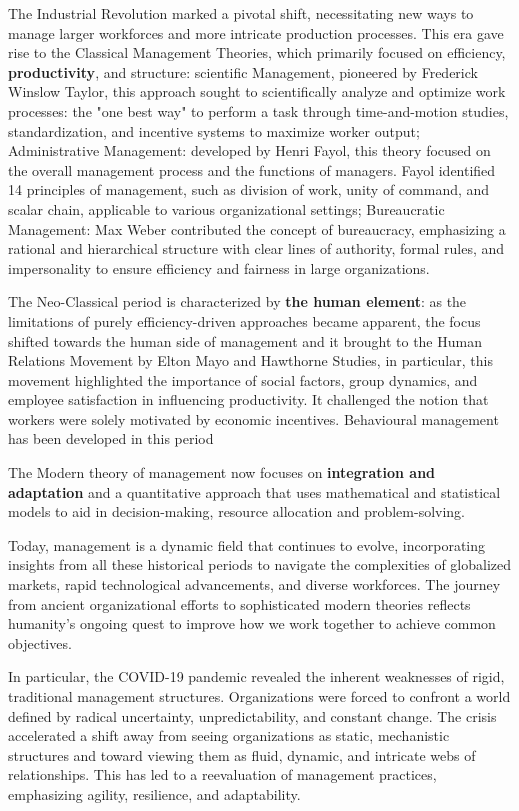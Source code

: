 \documentclass{article}
\begin{document}
The Industrial Revolution marked a pivotal shift, necessitating new ways to manage larger workforces and more intricate production processes. This era gave rise to the Classical Management Theories, which primarily focused on efficiency, \textbf{productivity}, and structure: scientific Management, pioneered by Frederick Winslow Taylor, this approach sought to scientifically analyze and optimize work processes: the "one best way" to perform a task through time-and-motion studies, standardization, and incentive systems to maximize worker output; Administrative Management: developed by Henri Fayol, this theory focused on the overall management process and the functions of managers. Fayol identified 14 principles of management, such as division of work, unity of command, and scalar chain, applicable to various organizational settings; Bureaucratic Management: Max Weber contributed the concept of bureaucracy, emphasizing a rational and hierarchical structure with clear lines of authority, formal rules, and impersonality to ensure efficiency and fairness in large organizations.

The Neo-Classical period is characterized by \textbf{the human element}: as the limitations of purely efficiency-driven approaches became apparent, the focus shifted towards the human side of management and it brought to the Human Relations Movement by Elton Mayo and Hawthorne Studies, in particular, this movement highlighted the importance of social factors, group dynamics, and employee satisfaction in influencing productivity. It challenged the notion that workers were solely motivated by economic incentives. Behavioural management has been developed in this period

The Modern theory of management now focuses on \textbf{integration and adaptation} and a quantitative approach that uses mathematical and statistical models to aid in decision-making, resource allocation and problem-solving.

Today, management is a dynamic field that continues to evolve, incorporating insights from all these historical periods to navigate the complexities of globalized markets, rapid technological advancements, and diverse workforces. The journey from ancient organizational efforts to sophisticated modern theories reflects humanity's ongoing quest to improve how we work together to achieve common objectives.

In particular, the COVID-19 pandemic revealed the inherent weaknesses of rigid, traditional management structures. Organizations were forced to confront a world defined by radical uncertainty, unpredictability, and constant change. The crisis accelerated a shift away from seeing organizations as static, mechanistic structures and toward viewing them as fluid, dynamic, and intricate webs of relationships.  This has led to a reevaluation of management practices, emphasizing agility, resilience, and adaptability.
\end{document}
